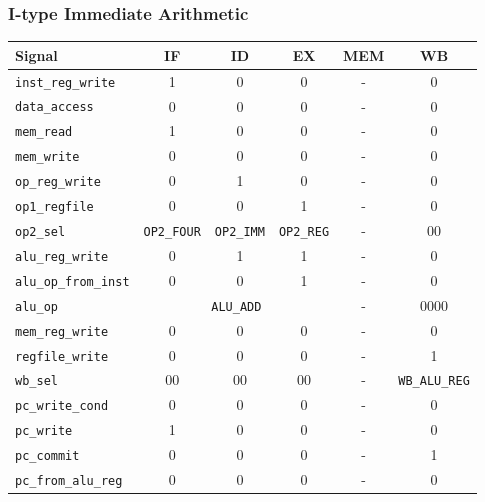 \documentclass{scrartcl}
\begin{document}
\subsubsection{I-type Immediate Arithmetic}
\begin{tabularx}{\textwidth}{ | X | c | c | c | c | c | }
  \hline
  \textbf{Signal} & \textbf{IF} & \textbf{ID} & \textbf{EX} & \textbf{MEM} & \textbf{WB} \\ \hline
  \texttt{inst\_reg\_write} & 1 & 0 & 0 & - & 0 \\ \hline
  \texttt{data\_access} & 0 & 0 & 0 & - & 0 \\ \hline
  \texttt{mem\_read} & 1 & 0 & 0 & - & 0 \\ \hline
  \texttt{mem\_write} & 0 & 0 & 0 & - & 0 \\ \hline
  \texttt{op\_reg\_write} & 0 & 1 & 0 & - & 0 \\ \hline
  \texttt{op1\_regfile} & 0 & 0 & 1 & - & 0 \\ \hline
  \texttt{op2\_sel} & \texttt{OP2\_FOUR} & \texttt{OP2\_IMM} & \texttt{OP2\_REG} & - & 00 \\ \hline
  \texttt{alu\_reg\_write} & 0 & 1 & 1 & - & 0 \\ \hline
  \texttt{alu\_op\_from\_inst} & 0 & 0 & 1 & - & 0 \\ \hline
  \texttt{alu\_op} & \multicolumn{3}{c|}{\texttt{ALU\_ADD}} & - & 0000 \\ \hline
  \texttt{mem\_reg\_write} & 0 & 0 & 0 & - & 0 \\ \hline
  \texttt{regfile\_write} & 0 & 0 & 0 & - & 1 \\ \hline
  \texttt{wb\_sel} & 00 & 00 & 00 & - & \texttt{WB\_ALU\_REG} \\ \hline
  \texttt{pc\_write\_cond} & 0 & 0 & 0 & - & 0 \\ \hline
  \texttt{pc\_write} & 1 & 0 & 0 & - & 0 \\ \hline
  \texttt{pc\_commit} & 0 & 0 & 0 & - & 1 \\ \hline
  \texttt{pc\_from\_alu\_reg} & 0 & 0 & 0 & - & 0 \\ \hline
\end{tabularx}
\end{document}
